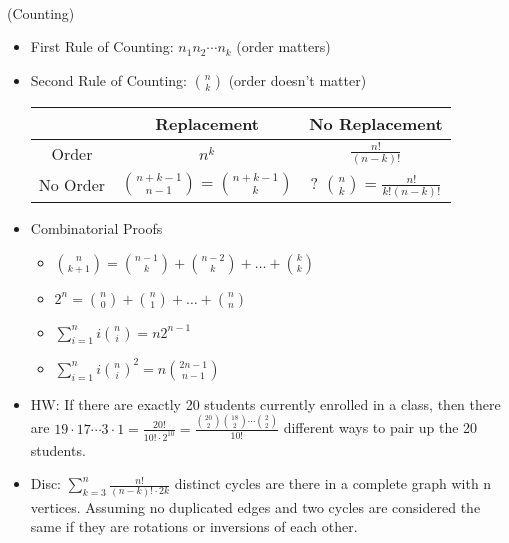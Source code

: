 \documentclass{article}
\begin{document}
 \\
(Counting)
\begin{itemize}
	\item First Rule of Counting: $n_1n_2\cdots n_k$ (order matters)
	\item Second Rule of Counting: $\binom{n}{k}$ (order doesn't matter)
\begin{center}
	\begin{tabular}{ |c|c|c| } 
 	\hline
 	 & Replacement & No Replacement \\
 	\hline
 	Order & $n^k$ & $\frac{n!}{(n-k)!}$ \\
 	\hline
 	No Order & $\binom{n+k-1}{n-1} = \binom{n+k-1}{k}$ & ? $\binom{n}{k} = \frac{n!}{k!(n-k)!}$ \\ 
 	\hline
	\end{tabular}
\end{center}
	\item Combinatorial Proofs
	\begin{itemize}
		\item $\binom{n}{k+1} = \binom{n-1}{k} + \binom{n-2}{k} + \dots + \binom{k}{k}$
		\item $2^n = \binom{n}{0} + \binom{n}{1} + \dots + \binom{n}{n}$
		\item $\sum\limits_{i=1}^n i\binom{n}{i} = n2^{n-1}$
		\item $\sum\limits_{i=1}^n i\binom{n}{i}^2 = n\binom{2n-1}{n-1}$
	\end{itemize}
	\item HW: If there are exactly 20 students currently enrolled in a class, then there are $19\cdot17\cdots3\cdot1 = \frac{20!}{10!\cdot2^{10}} = \frac{\binom{20}{2}\binom{18}{2}\cdots\binom{2}{2}} {10!}$ different ways to pair up the 20 students.
	\item Disc: $\sum\limits_{k=3}^n \frac{n!}{(n-k)!\cdot2k}$ distinct cycles are there in a complete graph with n vertices. Assuming no duplicated edges and two cycles are considered the same if they are rotations or inversions of each other.
\end{itemize}
\end{document}
